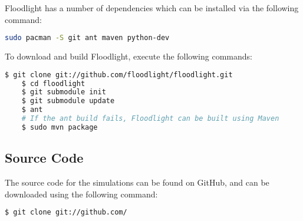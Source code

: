 Floodlight has a number of dependencies which can be installed via the following
command:

\begin{lstlisting}[language=bash, caption=Floodlight Dependencies]
	sudo pacman -S git ant maven python-dev
\end{lstlisting}

To download and build Floodlight, execute the following commands:

\begin{lstlisting}[language=bash, caption=Floodlight installation commands]
	$ git clone git://github.com/floodlight/floodlight.git
	$ cd floodlight
	$ git submodule init
	$ git submodule update
	$ ant
	# If the ant build fails, Floodlight can be built using Maven
	$ sudo mvn package
\end{lstlisting}

\subsection{Source Code}

The source code for the simulations can be found on GitHub, and can be
downloaded using the following command:

\begin{lstlisting}[language=bash, caption=Source code download]
	$ git clone git://github.com/
\end{lstlisting}

